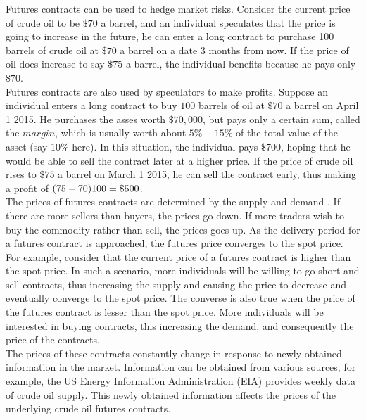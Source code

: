 \documentclass[runningheads]{llncs}
\begin{document}
\noindent Futures contracts can be used to hedge market risks. Consider the current price of crude oil to be $\$70$ a barrel, and an individual speculates that the price is going to increase in the future, he can enter a long contract to purchase 100 barrels of crude oil at $\$70$ a barrel on a date 3 months from now. If the price of oil does increase to say $\$75$ a barrel, the individual benefits because he pays only $\$70$.\\

\noindent Futures contracts are also used by speculators to make profits. Suppose an individual enters a long contract to buy $100$ barrels of oil at $\$70$ a barrel on April 1 2015. He purchases the asses worth $\$70,000$, but pays only a certain sum, called the $margin$, which is usually worth about $5\%-15\%$ of the total value of the asset (say $10\%$ here). In this situation, the individual pays $\$700$, hoping that he would be able to sell the contract later at a higher price. If the price of crude oil rises to $\$75$ a barrel on March 1 2015, he can sell the contract early, thus making a profit of $ (75-70)\*100 = \$500$. \\

\noindent The prices of futures contracts are determined by the supply and demand \cite{futuresbook}. If there are more sellers than buyers, the prices go down. If more traders wish to buy the commodity rather than sell, the prices goes up. As the delivery period for a futures contract is approached, the futures price converges to the spot price. For example, consider that the current price of a futures contract is higher than the spot price. In such a scenario, more individuals will be willing to go short and sell contracts, thus increasing the supply and causing the price to decrease and eventually converge to the spot price. The converse is also true when the price of the futures contract is lesser than the spot price. More individuals will be interested in buying contracts, this increasing the demand, and consequently the price of the contracts. \\
 
\noindent The prices of these contracts constantly change in response to newly obtained information in the market. Information can be obtained from various sources, for example, the US Energy Information Administration (EIA) provides weekly data of crude oil supply. This newly obtained information affects the prices of the underlying crude oil futures contracts. \\
\end{document}
